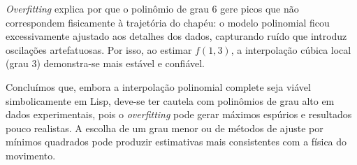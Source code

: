 \documentclass{article}
\begin{document}
\emph{Overfitting} explica por que o polinômio de grau 6 gere picos que não correspondem fisicamente à trajetória do chapéu: o modelo polinomial ficou excessivamente ajustado aos detalhes dos dados, capturando ruído que introduz oscilações artefatuosas. Por isso, ao estimar $f(1{,}3)$, a interpolação cúbica local (grau 3) demonstra-se mais estável e confiável.

Concluímos que, embora a interpolação polinomial complete seja viável simbolicamente em Lisp, deve-se ter cautela com polinômios de grau alto em dados experimentais, pois o \emph{overfitting} pode gerar máximos espúrios e resultados pouco realistas. A escolha de um grau menor ou de métodos de ajuste por mínimos quadrados pode produzir estimativas mais consistentes com a física do movimento.
\end{document}

